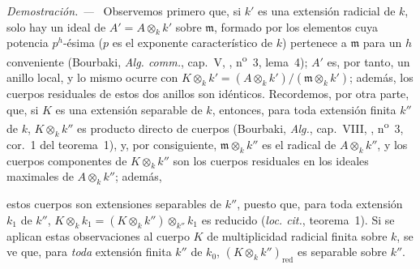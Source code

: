\documentclass[10pt,oneside]{book}
\newcommand{\oldpage}[2][]{%
  \setcounter{footnote}{0}%
  \marginpar{\scriptsize\textbf{#1}~|~#2}\ignorespaces}
\newenvironment{proof}{%
  \par\medskip\noindent\textit{Demostración. ---\ }}{\par}
\begin{document}
\begin{proof}
Observemos primero que, si $k'$ es una extensión radicial de $k$, solo hay un
ideal de $A'=A\otimes_k k'$ sobre $\mathfrak m$, formado por los elementos
cuya potencia $p^h$-ésima ($p$ es el exponente característico de $k$) pertenece a
$\mathfrak m$ para un $h$ conveniente (Bourbaki, \emph{Alg. comm.}, cap.~V,
, n\textsuperscript{o}~3, lema~4); $A'$ es, por tanto, un anillo
local, y lo mismo ocurre con
$K\otimes_k k'=(A\otimes_k k')/(\mathfrak m\otimes_k k')$; además, los cuerpos
residuales de estos dos anillos son idénticos. Recordemos, por otra parte, que,
si $K$ es una extensión separable de $k$, entonces, para toda extensión finita
$k''$ de $k$, $K\otimes_k k''$ es producto directo de cuerpos (Bourbaki,
\emph{Alg.}, cap.~VIII, , n\textsuperscript{o}~3, cor.~1 del
teorema~1), y, por consiguiente, $\mathfrak m\otimes_k k''$ es el radical de
$A\otimes_k k''$, y los cuerpos componentes de $K\otimes_k k''$ son los cuerpos
residuales en los ideales maximales de $A\otimes_k k''$; además,

\oldpage[0\textsubscript{IV-1}]{104}

estos cuerpos son extensiones separables de $k''$, puesto que, para toda
extensión $k_1$ de $k''$,
$K\otimes_k k_1=(K\otimes_k k'')\otimes_{k''}k_1$ es reducido
(\emph{loc. cit.}, teorema~1). Si se aplican estas observaciones al cuerpo $K$ de
multiplicidad radicial finita sobre $k$, se ve que, para \emph{toda} extensión
finita $k''$ de $k_0$, $(K\otimes_k k'')_{\mathrm{red}}$ es separable sobre
$k''$.


\end{proof}
\end{document}
